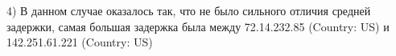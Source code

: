 \documentclass[a4paper,11pt]{article}
\begin{document}
\begin{center}
\label{fig:image}
\end{center}
4) В данном случае оказалось так, что не было сильного отличия средней задержки, самая большая задержка была между 72.14.232.85 (Country: US) и 142.251.61.221 (Country: US)
\end{document}
